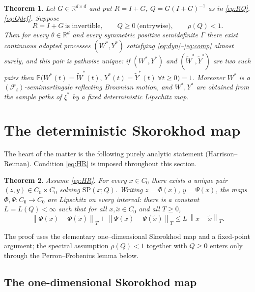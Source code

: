 \documentclass{amsart}
\newtheorem{theorem}{Theorem}
\theoremstyle{definition}
\theoremstyle{remark}
\newcommand{\R}{\mathbb{R}}
\newcommand{\norm}[1]{\left\lVert#1\right\rVert}
\begin{document}
\begin{theorem}\label{thm:main}
Let $G\in\R^{d\times d}$ and put $R=I+G$, $Q=G(I+G)^{-1}$ as in \eqref{eq:RQ},
\eqref{eq:Qdef}. Suppose
\begin{equation}\label{eq:HR}
  R=I+G\ \text{is invertible},\qquad Q\ge 0\ \text{(entrywise)},\qquad \rho(Q)<1 .
  \tag{HR}
\end{equation}
Then for every $\theta\in\R^d$ and every symmetric positive semidefinite
$\Gamma$ there exist continuous adapted processes $(W^\ast,Y^\ast)$ satisfying
\eqref{eq:dyn}--\eqref{eq:comp} almost surely, and this pair is pathwise unique:
if $(W^\ast,Y^\ast)$ and $(\widetilde W^\ast,\widetilde Y^\ast)$ are two such
pairs then $\mathbb P\big(W^\ast(t)=\widetilde W^\ast(t),\,
Y^\ast(t)=\widetilde Y^\ast(t)\ \forall t\ge 0\big)=1$.
Moreover $W^\ast$ is a $(\mathcal F_t)$-semimartingale reflecting Brownian
motion, and $W^\ast,Y^\ast$ are obtained from the sample paths of $\xi^\ast$ by
a fixed deterministic Lipschitz map.
\end{theorem}

\section{The deterministic Skorokhod map}

The heart of the matter is the following purely analytic statement
(Harrison--Reiman). Condition \eqref{eq:HR} is imposed throughout this section.

\begin{theorem}\label{thm:HR}
Assume \eqref{eq:HR}. For every $x\in C_0$ there exists a unique pair
$(z,y)\in C_0\times C_0$ solving $\mathrm{SP}(x;Q)$. Writing
$z=\Phi(x)$, $y=\Psi(x)$, the maps $\Phi,\Psi:C_0\to C_0$ are Lipschitz on
every interval: there is a constant $L=L(Q)<\infty$ such that for all
$x,\tilde x\in C_0$ and all $T\ge 0$,
\begin{equation}\label{eq:lip}
  \norm{\Phi(x)-\Phi(\tilde x)}_T+\norm{\Psi(x)-\Psi(\tilde x)}_T
  \le L\,\norm{x-\tilde x}_T .
\end{equation}
\end{theorem}

The proof uses the elementary one--dimensional Skorokhod map and a fixed-point
argument; the spectral assumption $\rho(Q)<1$ together with $Q\ge0$ enters only
through the Perron--Frobenius lemma below.

\subsection{The one-dimensional Skorokhod map}
\end{document}
